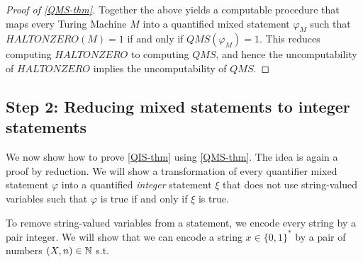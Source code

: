 \begin{proof}[Proof of \cref{QMS-thm}]
Together the above yields a computable procedure that maps every Turing
Machine \(M\) into a quantified mixed statement \(\varphi_M\) such that
\(\ensuremath{\mathit{HALTONZERO}}(M)=1\) if and only if
\(\ensuremath{\mathit{QMS}}(\varphi_M)=1\). This reduces computing
\(\ensuremath{\mathit{HALTONZERO}}\) to computing
\(\ensuremath{\mathit{QMS}}\), and hence the uncomputability of
\(\ensuremath{\mathit{HALTONZERO}}\) implies the uncomputability of
\(\ensuremath{\mathit{QMS}}\).

\end{proof}

\hypertarget{alternativeproofs}{}

\subsection{Step 2: Reducing mixed statements to integer
statements}\label{Step--Reducing-mixed-stat}

We now show how to prove \cref{QIS-thm} using \cref{QMS-thm}. The idea
is again a proof by reduction. We will show a transformation of every
quantifier mixed statement \(\varphi\) into a quantified \emph{integer}
statement \(\xi\) that does not use string-valued variables such that
\(\varphi\) is true if and only if \(\xi\) is true.

To remove string-valued variables from a statement, we encode every
string by a pair integer. We will show that we can encode a string
\(x\in \{0,1\}^*\) by a pair of numbers \((X,n)\in {\mathbb{N}}\) s.t.

